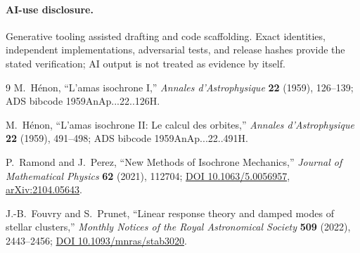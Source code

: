 \documentclass[10pt]{article}
\begin{document}
\paragraph{AI-use disclosure.}
Generative tooling assisted drafting and code scaffolding.  Exact identities,
independent implementations, adversarial tests, and release hashes provide
the stated verification; AI output is not treated as evidence by itself.
\fi

\begin{thebibliography}{9}
M.~H\'enon,
``L'amas isochrone I,''
\emph{Annales d'Astrophysique} \textbf{22} (1959), 126--139;
ADS bibcode 1959AnAp...22..126H.

M.~H\'enon,
``L'amas isochrone II: Le calcul des orbites,''
\emph{Annales d'Astrophysique} \textbf{22} (1959), 491--498;
ADS bibcode 1959AnAp...22..491H.

P.~Ramond and J.~Perez,
``New Methods of Isochrone Mechanics,''
\emph{Journal of Mathematical Physics} \textbf{62} (2021), 112704;
\href{https://doi.org/10.1063/5.0056957}{DOI 10.1063/5.0056957},
\href{https://arxiv.org/abs/2104.05643}{arXiv:2104.05643}.

J.-B.~Fouvry and S.~Prunet,
``Linear response theory and damped modes of stellar clusters,''
\emph{Monthly Notices of the Royal Astronomical Society} \textbf{509}
(2022), 2443--2456;
\href{https://doi.org/10.1093/mnras/stab3020}{DOI 10.1093/mnras/stab3020}.
\end{thebibliography}
\end{document}
